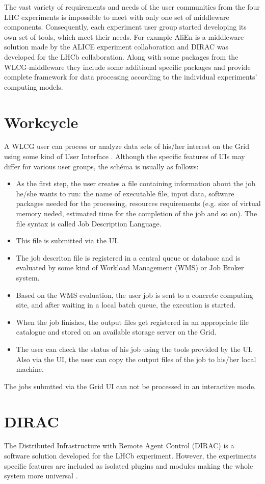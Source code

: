 The vast variety of requirements and needs of the user communities from the four LHC experiments is impossible to meet with only one set of middleware components. Consequently, each experiment user group started developing its own set of tools, which meet their needs. For example AliEn is a middleware solution made by the ALICE experiment collaboration and DIRAC was developed for the LHCb collaboration. Along with some packages from the WLCG-middleware they include some additional specific packages and provide complete framework for data processing according to the individual experiments' computing models.

\section*{Workcycle}
A WLCG user can process or analyze data sets of his/her interest on the Grid using some kind of User Interface \cite{UI}. Although the specific features of  UIs may differ for various user groups, the schéma is usually as follows:
\begin{itemize}
%
\item As the first step, the user creates a file containing information about the job he/she wants to run: the name of executable file, input data, software packages needed for the processing, resources requirements (e.g. size of virtual memory neded, estimated time for the completion of the job and so on). The file syntax is called Job Description Language. %
%
\item This file is submitted via the UI.
%
\item  The job descriton file is registered in a central queue or database and is evaluated by some kind of Workload Management (WMS) or Job Broker system. %
%
\item Based on the WMS evaluation, the user job is sent  to a concrete computing site, and after waiting in a local batch queue, the execution is started.
%
\item When the job finishes, the output files get registered in an appropriate file catalogue and stored on an available storage server on the Grid.
%
\item The user can check the status of his job using the tools provided by the UI. Also via the UI, the user can copy the output files of the job to his/her local machine. 
%
\end{itemize}
The jobs submtted via the Grid UI can not be processed in an interactive mode.

\section*{DIRAC}
The Distributed Infrastructure with Remote Agent Control (DIRAC) is a software solution developed for the LHCb experiment. However, the experiments specific features are included as isolated plugins and modules making the whole system more universal \cite{Dir1}.